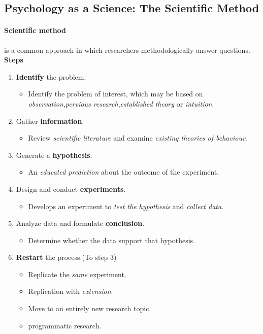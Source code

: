 \documentclass{article}
\begin{document}
 	\subsection{Psychology as a Science: The Scientific Method}
 	\paragraph{Scientific method} is a common approach in which researchers methodologically answer questions.
 	\newline \textbf{Steps}
 	\begin{enumerate}
 		\item \textbf{Identify} the problem.
 			\begin{itemize}
 				\item Identify the problem of interest, which may be based on \emph{observation},\emph{pervious research},\emph{established theory} or \emph{intuition}.
 			\end{itemize}
 		\item Gather \textbf{information}.
 			\begin{itemize}
 				\item Review \emph{scientific literature} and examine \emph{existing theories of behaviour}.
 			\end{itemize}
 		\item Generate a \textbf{hypothesis}.
 			\begin{itemize}
				\item An \emph{educated prediction} about the outcome of the experiment.
 			\end{itemize}
 		\item Design and conduct \textbf{experiments}.
 			\begin{itemize}
 				\item Develops an experiment to \emph{test the hypothesis} and \emph{collect data}.
 			\end{itemize}
 		\item Analyze data and formulate \textbf{conclusion}.
 			\begin{itemize}
 				\item Determine whether the data support that hypothesis.
 			\end{itemize}
 		\item \textbf{Restart} the process.(To step 3)
 			\begin{itemize}
 				\item Replicate the \emph{same} experiment.
 				\item Replication with \emph{extension}.
 				\item Move to an entirely new research topic.
 				\item programmatic research.
 			\end{itemize}
 	\end{enumerate}
\end{document}
